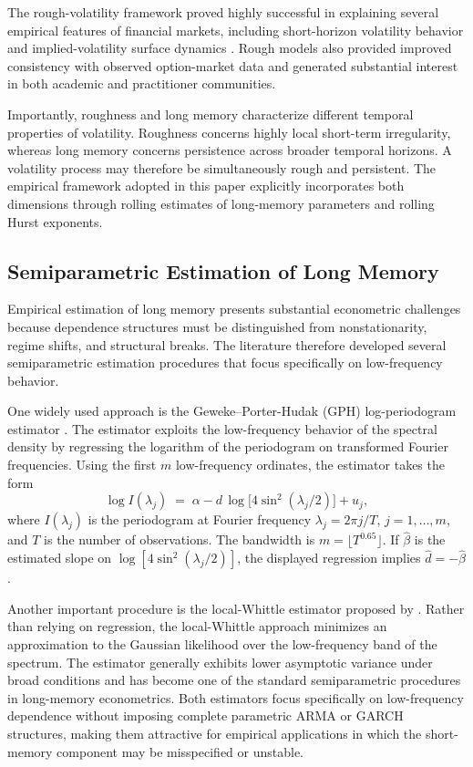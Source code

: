 \documentclass[jrfm,article,submit,moreauthors,pdftex]{Definitions/mdpi}
\begin{document}
The rough-volatility framework proved highly successful in explaining
several empirical features of financial markets, including short-horizon
volatility behavior and implied-volatility surface dynamics
\citep{bennedsen2021decoupling}. Rough models also provided improved
consistency with observed option-market data and generated substantial
interest in both academic and practitioner communities.

Importantly, roughness and long memory characterize different temporal
properties of volatility. Roughness concerns highly local short-term
irregularity, whereas long memory concerns persistence across broader
temporal horizons. A volatility process may therefore be simultaneously
rough and persistent. The empirical framework adopted in this paper
explicitly incorporates both dimensions through rolling estimates of
long-memory parameters and rolling Hurst exponents.

\subsection{Semiparametric Estimation of Long Memory}

Empirical estimation of long memory presents substantial econometric
challenges because dependence structures must be distinguished from
nonstationarity, regime shifts, and structural breaks. The literature
therefore developed several semiparametric estimation procedures that focus
specifically on low-frequency behavior.

One widely used approach is the Geweke--Porter-Hudak (GPH)
log-periodogram estimator \citep{geweke1983estimation}. The estimator
exploits the low-frequency behavior of the spectral density by regressing
the logarithm of the periodogram on transformed Fourier frequencies. Using
the first $m$ low-frequency ordinates, the estimator takes the form
\begin{equation}
  \log I(\lambda_j) \;=\; \alpha
  - d\,\log\bigl[4\sin^2(\lambda_j/2)\bigr] + u_j,
\end{equation}
where $I(\lambda_j)$ is the periodogram at Fourier frequency
$\lambda_j=2\pi j/T$, $j=1,\ldots,m$, and $T$ is the number of observations.
The bandwidth is $m=\lfloor T^{0.65}\rfloor$. If $\hat\beta$ is the estimated
slope on $\log[4\sin^2(\lambda_j/2)]$, the displayed regression implies
$\hat d=-\hat\beta$.

Another important procedure is the local-Whittle estimator proposed by
\citet{robinson1995gaussian}. Rather than relying on regression, the
local-Whittle approach minimizes an approximation to the Gaussian likelihood
over the low-frequency band of the spectrum. The estimator generally
exhibits lower asymptotic variance under broad conditions and has become one
of the standard semiparametric procedures in long-memory econometrics. Both
estimators focus specifically on low-frequency dependence without imposing
complete parametric ARMA or GARCH structures, making them attractive for
empirical applications in which the short-memory component may be
misspecified or unstable.
\end{document}
